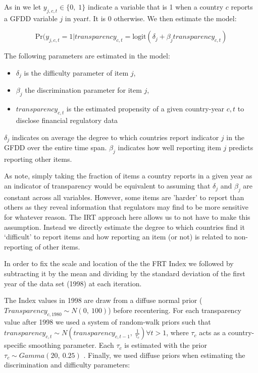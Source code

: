 \documentclass[a4paper]{article}
\begin{document}
As in \cite{Hollyer2014} we let $y_{j,c,t} \in \{0,\; 1\}$ indicate a variable that is 1 when a country $c$ reports a GFDD variable $j$ in year$t$. It is 0 otherwise. We then estimate the model:

\begin{equation}
    \mathrm{Pr}(y_{j,c,t} = 1|transparency_{c,t} = \mathrm{logit}(\delta_{j} + \beta_{j}transparency_{c,t})
\end{equation}

The following parameters are estimated in the model:

\begin{itemize}
    \item $\delta_{j}$ is the difficulty parameter of item $j$,
    \item $\beta_{j}$ the discrimination parameter for item $j$,
    \item $transparency_{c,t}$ is the estimated propensity of a given country-year $c,t$ to disclose financial regulatory data
\end{itemize}

\noindent $\delta_{j}$ indicates on average the degree to which countries report indicator $j$ in the GFDD over the entire time span. $\beta_{j}$ indicates how well reporting item $j$ predicts reporting other items. 

As \cite{Hollyer2014} note, simply taking the fraction of items a country reports in a given year as an indicator of transparency would be equivalent to assuming that $\delta_{j}$ and $\beta_{j}$ are constant across all variables. However, some items are 'harder' to report than others as they reveal information that regulators may find to be more sensitive for whatever reason. The IRT approach here allows us to not have to make this assumption. Instead we directly estimate the degree to which countries find it `difficult' to report items and how reporting an item (or not) is related to non-reporting of other items.

In order to fix the scale and location of the the FRT Index we followed \cite{Hollyer2014} by subtracting it by the mean and dividing by the standard deviation of the first year of the data set (1998) at each iteration. 

The Index values in 1998 are draw from a diffuse normal prior ($Transparency_{c,1980} \sim N(0,\:100)$) before recentering. For each transparency value after 1998 we used a system of random-walk priors such that $transparency_{c,t} \sim N(transparency_{c,t-1},\: \frac{1}{\tau_{c}}) \forall t > 1$, where $\tau_{c}$ acts as a country-specific smoothing parameter. Each $\tau_{c}$ is estimated with the prior $\tau_{c} \sim Gamma(20,\:0.25)$ \citep[for more details see][8]{Jackman2009,Hollyer2014}. Finally, we used diffuse priors when estimating the discrimination and difficulty parameters:
\end{document}
